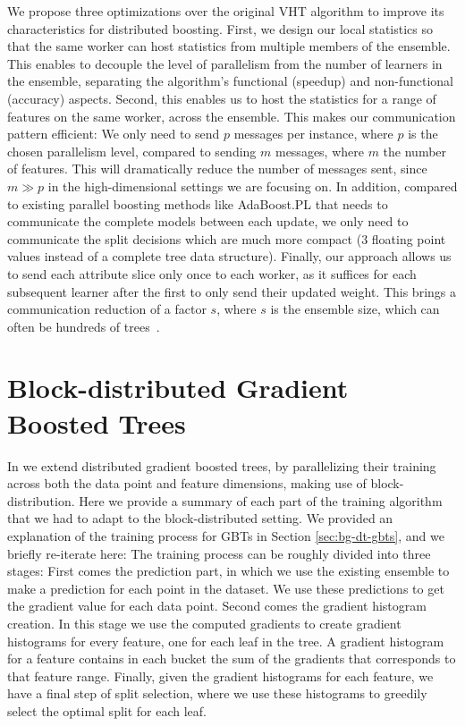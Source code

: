 We propose three optimizations over the original VHT algorithm to improve its
characteristics for distributed boosting. First, we design our local statistics
so that the same worker can host statistics from multiple members of the ensemble.
This enables to decouple the level of parallelism from the number of learners
in the ensemble, separating the algorithm's functional (speedup) and non-functional
(accuracy) aspects.
Second, this enables us to host the statistics for a range of features on the same
worker, across the ensemble. This makes our communication pattern efficient:
We only need to send $p$  messages per instance, where $p$ is the chosen
parallelism level, compared to sending $m$ messages, where $m$ the
number of features. This will dramatically
reduce the number of messages sent, since $m \gg p$ in the high-dimensional
settings we are focusing on. In addition, compared to existing
parallel boosting methods like AdaBoost.PL \cite{adaboost-pl} that needs to communicate the complete
models between each update, we only need to communicate the split decisions which are
much more compact (3 floating point values instead of a complete tree data structure).
Finally, our approach allows us to send each attribute slice only once to
each worker, as it suffices for each subsequent learner after the first
to only send their updated weight. This brings a communication reduction
of a factor $s$, where $s$ is the ensemble size, which can often be hundreds of
trees~\cite{hundreds-classifiers}.

\section{Block-distributed Gradient Boosted Trees}
\label{sec:block-gbt}

In \blockgbt we extend distributed gradient boosted trees, by parallelizing their
training across both the data point and feature dimensions, making use of block-distribution.
Here we provide a summary of each part of the training algorithm that we had to
adapt to the block-distributed setting. We provided an explanation of the training
process for GBTs in Section \ref{sec:bg-dt-gbts}, and we briefly re-iterate here:
The training process can be roughly divided into three stages: First comes
the prediction part, in which we use the existing ensemble to make a prediction
for each point in the dataset. We use these predictions to get the gradient
value for each data point. Second comes the gradient histogram creation.
In this stage we use the computed gradients to create gradient histograms
for every feature, one for each leaf in the tree. A gradient histogram
for a feature contains in each bucket the sum of the gradients that corresponds to
that feature range. Finally, given the gradient histograms for each feature,
we have a final step of split selection, where we use these histograms to greedily
select the optimal split for each leaf.

